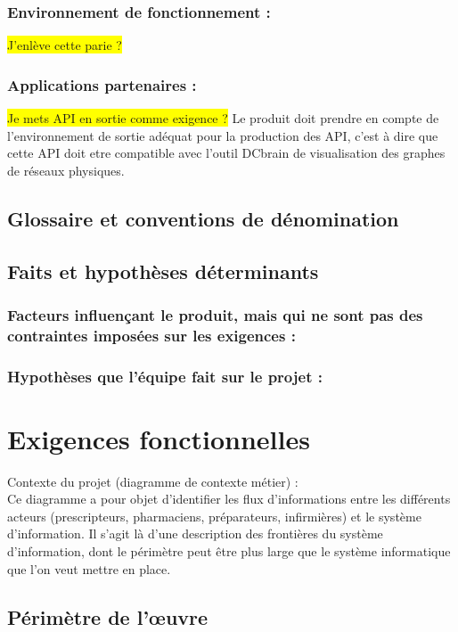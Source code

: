 			\subsubsection{Environnement de fonctionnement :} \colorbox{yellow}{J'enlève cette parie ?}
			\subsubsection{Applications partenaires :}
			\colorbox{yellow}{Je mets API en sortie comme exigence ?}
			Le produit doit prendre en compte de l'environnement de sortie adéquat pour la production des API, c'est à dire que cette API doit etre compatible avec l'outil DCbrain de visualisation des graphes de réseaux physiques.
		
		\subsection{Glossaire et conventions de dénomination}
		
		\subsection{Faits et hypothèses déterminants}
			\subsubsection{Facteurs influençant le produit, mais qui ne sont pas des contraintes imposées sur les exigences :}
			\subsubsection{Hypothèses que l’équipe fait sur le projet :}
		
	\section{Exigences fonctionnelles}
		{\color{red}
		Contexte du projet (diagramme de contexte métier) :\\	 
		Ce diagramme a pour objet d’identifier les flux d’informations entre les différents acteurs (prescripteurs, pharmaciens, préparateurs, infirmières) et le système d’information.
		Il s’agit là d’une description des frontières du système d’information, dont le périmètre peut être plus large que le système informatique que l’on veut mettre en place.
		}

		\subsection{Périmètre de l'œuvre}
		
